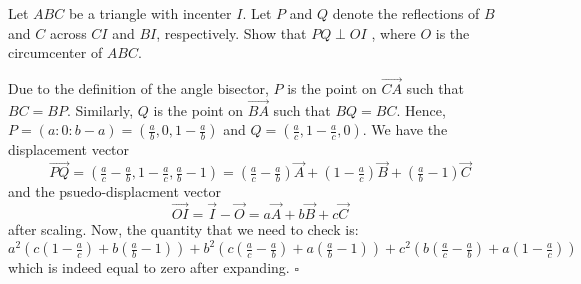 \documentclass{article}
\begin{document}
\begin{problem}[7.41]{}
Let $ABC$ be a triangle with incenter $I$. Let $P$ and $Q$ denote the reflections of $B$ and $C$ across $CI$ and $BI$, respectively. Show that $PQ \perp OI$ , where $O$ is the circumcenter of $ABC$.
\end{problem}
Due to the definition of the angle bisector, $P$ is the point on $\overrightarrow{CA}$ such that $BC = BP$. Similarly, $Q$ is the point on $\overrightarrow{BA}$ such that $BQ = BC$. Hence, $P = (a : 0 : b-a) = \left(\tfrac{a}{b}, 0, 1-\tfrac{a}{b}\right)$ and $Q = \left(\frac{a}{c}, 1-\tfrac{a}{c}, 0\right)$. We have the displacement vector \[\overrightarrow{PQ} = \left(\tfrac{a}{c}-\tfrac{a}{b}, 1-\tfrac{a}{c}, \tfrac{a}{b}-1\right) = \left(\tfrac{a}{c}-\tfrac{a}{b}\right)\overrightarrow{A}+\left(1-\tfrac{a}{c}\right)\overrightarrow{B}+\left(\tfrac{a}{b}-1\right)\overrightarrow{C}\] and the psuedo-displacment vector \[\overrightarrow{OI} = \overrightarrow{I}-\overrightarrow{O} = a\overrightarrow{A}+b\overrightarrow{B}+c\overrightarrow{C}\] after scaling. Now, the quantity that we need to check is: \[a^2\left(c\left(1-\tfrac{a}{c}\right)+b\left(\tfrac{a}{b}-1\right)\right)+b^2\left(c\left(\tfrac{a}{c}-\tfrac{a}{b}\right)+a\left(\tfrac{a}{b}-1\right)\right)+c^2\left(b\left(\tfrac{a}{c}-\tfrac{a}{b}\right)+a\left(1-\tfrac{a}{c}\right)\right)\] which is indeed equal to zero after expanding. $\square$
\end{document}

